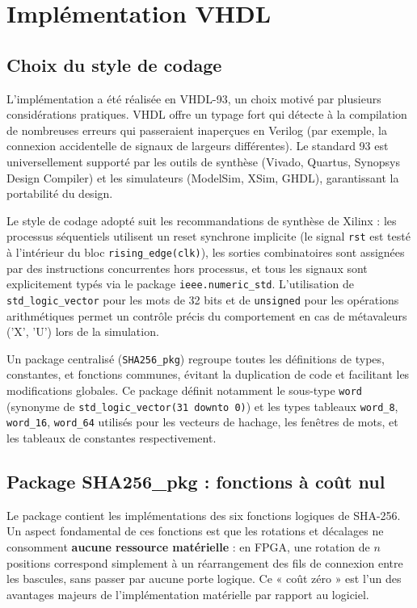 \section{Implémentation VHDL}
\label{sec:impl}

\subsection{Choix du style de codage}

L'implémentation a été réalisée en VHDL-93, un choix motivé par plusieurs considérations pratiques. VHDL offre un typage fort qui détecte à la compilation de nombreuses erreurs qui passeraient inaperçues en Verilog (par exemple, la connexion accidentelle de signaux de largeurs différentes). Le standard 93 est universellement supporté par les outils de synthèse (Vivado, Quartus, Synopsys Design Compiler) et les simulateurs (ModelSim, XSim, GHDL), garantissant la portabilité du design.

Le style de codage adopté suit les recommandations de synthèse de Xilinx : les processus séquentiels utilisent un reset synchrone implicite (le signal \texttt{rst} est testé à l'intérieur du bloc \texttt{rising\_edge(clk)}), les sorties combinatoires sont assignées par des instructions concurrentes hors processus, et tous les signaux sont explicitement typés via le package \texttt{ieee.numeric\_std}. L'utilisation de \texttt{std\_logic\_vector} pour les mots de 32 bits et de \texttt{unsigned} pour les opérations arithmétiques permet un contrôle précis du comportement en cas de métavaleurs ('X', 'U') lors de la simulation.

Un package centralisé (\texttt{SHA256\_pkg}) regroupe toutes les définitions de types, constantes, et fonctions communes, évitant la duplication de code et facilitant les modifications globales. Ce package définit notamment le sous-type \texttt{word} (synonyme de \texttt{std\_logic\_vector(31 downto 0)}) et les types tableaux \texttt{word\_8}, \texttt{word\_16}, \texttt{word\_64} utilisés pour les vecteurs de hachage, les fenêtres de mots, et les tableaux de constantes respectivement.

\subsection{Package SHA256\_pkg : fonctions à coût nul}

Le package contient les implémentations des six fonctions logiques de SHA-256. Un aspect fondamental de ces fonctions est que les rotations et décalages ne consomment \textbf{aucune ressource matérielle} : en FPGA, une rotation de $n$ positions correspond simplement à un réarrangement des fils de connexion entre les bascules, sans passer par aucune porte logique. Ce « coût zéro » est l'un des avantages majeurs de l'implémentation matérielle par rapport au logiciel.

